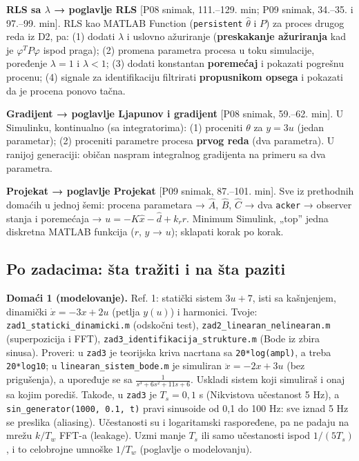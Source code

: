 \documentclass[11pt,a4paper,parskip=half,headsepline,numbers=noenddot]{scrartcl}
\DeclareRobustCommand{\izvor}[1]{{\small\color{izvorC}[#1]}}
\begin{document}
\textbf{RLS sa \(\lambda\) → poglavlje RLS} {[}P08 snimak, 111.--129. min; P09 snimak, 34.--35. i 97.--99. min{]}. RLS kao MATLAB Function (\texttt{persistent} \(\hat\theta\) i \(P\)) za proces drugog reda iz D2, pa: (1) dodati \(\lambda\) i uslovno ažuriranje (\textbf{preskakanje ažuriranja} kad je \(\varphi^TP\varphi\) ispod praga); (2) promena parametra procesa u toku simulacije, poređenje \(\lambda = 1\) i \(\lambda < 1\); (3) dodati konstantan \textbf{poremećaj} i pokazati pogrešnu procenu; (4) signale za identifikaciju filtrirati \textbf{propusnikom opsega} i pokazati da je procena ponovo tačna.

\textbf{Gradijent → poglavlje Ljapunov i gradijent} \izvor{P08 snimak, 59.--62. min}. U Simulinku, kontinualno (sa integratorima): (1) proceniti \(\theta\) za \(y = 3u\) (jedan parametar); (2) proceniti parametre procesa \textbf{prvog reda} (dva parametra). U ranijoj generaciji: običan naspram integralnog gradijenta na primeru sa dva parametra.

\textbf{Projekat → poglavlje Projekat} \izvor{P09 snimak, 87.--101. min}. Sve iz prethodnih domaćih u jednoj šemi: procena parametara → \(\hat A\), \(\hat B\), \(\hat C\) → dva \texttt{acker} → observer stanja i poremećaja → \(u = -K\hat x - \hat d + k_rr\). Minimum Simulink, „top'' jedna diskretna MATLAB funkcija (\(r\), \(y\) → \(u\)); sklapati korak po korak.

\subsection{Po zadacima: šta tražiti i na šta paziti}

\textbf{Domaći 1 (modelovanje).} Ref. 1: statički sistem \(3u + 7\), isti sa kašnjenjem, dinamički \(\dot x = -3x + 2u\) (petlja \(y(u)\)) i harmonici. Tvoje: \texttt{zad1\_\allowbreak{}staticki\_\allowbreak{}dinamicki.m} (odskočni test), \texttt{zad2\_\allowbreak{}linearan\_\allowbreak{}nelinearan.m} (superpozicija i FFT), \texttt{zad3\_\allowbreak{}identifikacija\_\allowbreak{}strukture.m} (Bode iz zbira sinusa). Proveri: u \texttt{zad3} je teorijska kriva nacrtana sa \texttt{20*log(\allowbreak{}ampl)}, a treba \texttt{20*log10}; u \texttt{linearan\_\allowbreak{}sistem\_\allowbreak{}bode.m} je simuliran \(\ddot x = -2x + 3u\) (bez prigušenja), a upoređuje se sa \(\frac{1}{s^3 + 6s^2 + 11s + 6}\). Uskladi sistem koji simuliraš i onaj sa kojim porediš. Takođe, u \texttt{zad3} je \(T_s = 0{,}1\) s (Nikvistova učestanost 5 Hz), a \texttt{sin\_\allowbreak{}generator(\allowbreak{}1000,\allowbreak{}\ 0.1,\allowbreak{}\ t)} pravi sinusoide od 0,1 do 100 Hz: sve iznad 5 Hz se preslika (aliasing). Učestanosti su i logaritamski raspoređene, pa ne padaju na mrežu \(k/T_w\) FFT-a (leakage). Uzmi manje \(T_s\) ili samo učestanosti ispod \(1/(5T_s)\), i to celobrojne umnoške \(1/T_w\) (poglavlje o modelovanju).
\end{document}
